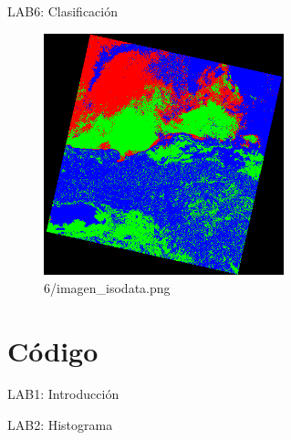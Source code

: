 \documentclass{beamer}
\begin{document}
\begin{frame}{LAB6: Clasificación}
\begin{figure}[h]
\centering
\includegraphics[height=7cm]{img/6/imagen_isodata.png}
\caption{6/imagen\_isodata.png}
\end{figure}
\end{frame}

\section{Código}

\begin{frame}{LAB1: Introducción}
\only<1>{

}
\only<2>{

}
\end{frame}

\begin{frame}{LAB2: Histograma}
\only<2>{


}
\only<3>{

}
\only<4>{

}
\end{frame}
\end{document}
